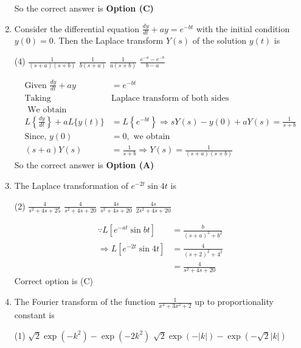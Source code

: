\begin{enumerate}
\begin{answer}
$$$$
So the correct answer is \textbf{Option (C)}
\end{answer}
\item Consider the differential equation $\frac{d y}{d t}+a y=e^{-b t}$ with the initial condition $y(0)=0$. Then the Laplace transform $Y(s)$ of the solution $y(t)$ is
\begin{tasks}(4)
	\task[\textbf{A.}] $\frac{1}{(s+a)(s+b)}$
	\task[\textbf{B.}] $\frac{1}{b(s+a)}$
	\task[\textbf{C.}] $\frac{1}{a(s+b)}$
	\task[\textbf{D.}] $\frac{e^{-a}-e^{-b}}{b-a}$
\end{tasks}
\begin{answer}
	$$
	\begin{aligned}
	\text{Given }\frac{d y}{d t}+a y&=e^{-b t}\\
	\text{Taking }&\text{Laplace transform of both sides}\\
	\text{	We obtain}\\
	L\left\{\frac{d y}{d t}\right\}+a L\{y(t)\}&=L\left\{e^{-b t}\right\} \Rightarrow s Y(s)-y(0)+a Y(s)=\frac{1}{s+b}\\
	\text{Since, }	y(0)&=0,\text{ we obtain}\\
	(s+a) Y(s)&=\frac{1}{s+b} \Rightarrow Y(s)=\frac{1}{(s+a)(s+b)}
	\end{aligned}
	$$
	So the correct answer is \textbf{Option (A)}
\end{answer}
\item The Laplace transformation of $e^{-2 t} \sin 4 t$ is
\begin{tasks}(2)
	\task[\textbf{a.}]$\frac{4}{s^{2}+4 s+25}$
	\task[\textbf{b.}]$\frac{4}{s^{2}+4 s+20}$
	\task[\textbf{c.}]$\frac{4 s}{s^{2}+4 s+20}$
	\task[\textbf{d.}] $\frac{4 s}{2 s^{2}+4 s+20}$
\end{tasks}
\begin{answer}
	$$\begin{aligned}
	\because L\left[e^{-a t} \sin b t\right]&=\frac{b}{(s+a)^{2}+b^{2}}\\
	\Rightarrow L\left[e^{-2 t} \sin 4 t\right]&=\frac{4}{(s+2)^{2}+4^{2}}\\&=\frac{4}{s^{2}+4 s+20}
	\end{aligned}$$
	Correct option is (C)
\end{answer}
\item The Fourier transform of the function $\frac{1}{x^{4}+3 x^{2}+2}$ up to proportionality constant is
\begin{tasks}(1)
	\task[\textbf{a.}] $\sqrt{2} \exp \left(-k^{2}\right)-\exp \left(-2 k^{2}\right)$
	\task[\textbf{b.}]$\sqrt{2} \exp (-|k|)-\exp (-\sqrt{2}|k|)$

\end{tasks}
\end{enumerate}
